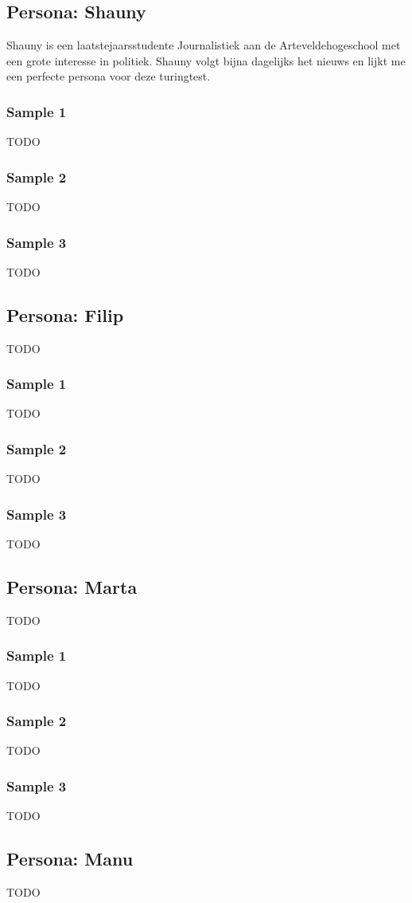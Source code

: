  \subsection{Persona: Shauny}
Shauny is een laatstejaarsstudente Journalistiek aan de Arteveldehogeschool met een grote interesse in politiek. Shauny volgt bijna dagelijks het nieuws en lijkt me een perfecte persona voor deze turingtest.
 \subsubsection{Sample 1}
 TODO
 \subsubsection{Sample 2}
 TODO
 \subsubsection{Sample 3}
 TODO
\subsection{Persona: Filip}
 TODO
\subsubsection{Sample 1}
 TODO
\subsubsection{Sample 2}
 TODO
\subsubsection{Sample 3}
 TODO
 
\subsection{Persona: Marta}
  TODO
\subsubsection{Sample 1}
TODO
\subsubsection{Sample 2}
TODO
\subsubsection{Sample 3}
 TODO
 
\subsection{Persona: Manu}
  TODO
